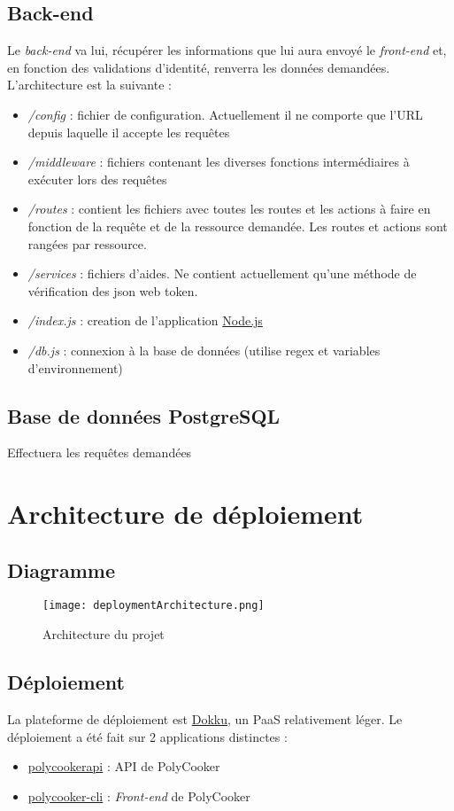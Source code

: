 \subsection{Back-end}
Le \textit{back-end} va lui, récupérer les informations que lui aura envoyé le \textit{front-end} et, en fonction des validations d'identité, renverra les données demandées. L'architecture est la suivante :
\begin{itemize}
	\item \textit{/config} : fichier de configuration. Actuellement il ne comporte que l'URL depuis laquelle il accepte les requêtes
	\item \textit{/middleware} : fichiers contenant les diverses fonctions intermédiaires à exécuter lors des requêtes
	\item \textit{/routes} : contient les fichiers avec toutes les routes et les actions à faire en fonction de la requête et de la ressource demandée. Les routes et actions sont rangées par ressource.
	\item \textit{/services} : fichiers d'aides. Ne contient actuellement qu'une méthode de vérification des json web token.
	\item \textit{/index.js} : creation de l'application \href{https://nodejs.org/en/}{Node.js}
	\item \textit{/db.js} : connexion à la base de données (utilise regex et variables d'environnement)
\end{itemize}
\subsection{Base de données PostgreSQL}
Effectuera les requêtes demandées
\section{Architecture de déploiement}
\subsection{Diagramme}
\begin{figure}[h]
	\texttt{[image: deploymentArchitecture.png]}
	\caption{Architecture du projet}
\end{figure}
\subsection{Déploiement}
La plateforme de déploiement est \href{https://dokku.com/}{Dokku}, un PaaS relativement léger. Le déploiement a été fait sur 2 applications distinctes :
\begin{itemize}
	\item \href{https://polycookerapi.cluster-ig3.igpolytech.fr/}{polycookerapi} : API de PolyCooker
	\item \href{https://polycooker.cluster-ig3.igpolytech.fr/api}{polycooker-cli} : \textit{Front-end} de PolyCooker
\end{itemize}
\pagebreak
